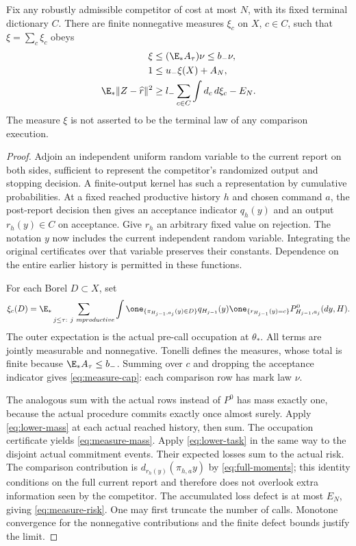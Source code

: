 \begin{lemma}\label{lem:comparison}
Fix any robustly admissible competitor of cost at most $N$, with its fixed terminal dictionary $C$. There are finite nonnegative measures $\xi_c$ on $X$, $c\in C$, such that $\xi=\sum_c\xi_c$ obeys
\begin{align}
 \xi&\le (\E_*A_\tau)\nu\le b_-\nu,\label{eq:measure-cap}\\
 1&\le u_-\xi(X)+A_N,\label{eq:measure-mass}\\
 \E_*\|Z-\widehat r\|^2
 &\ge l_-\sum_{c\in C}\int d_c\,d\xi_c-E_N.
 \label{eq:measure-risk}
\end{align}
The measure $\xi$ is not asserted to be the terminal law of any comparison execution.
\end{lemma}
\begin{proof}
Adjoin an independent uniform random variable to the current report on both sides, sufficient to represent the competitor's randomized output and stopping decision. A finite-output kernel has such a representation by cumulative probabilities. At a fixed reached productive history $h$ and chosen command $a$, the post-report decision then gives an acceptance indicator $q_h(y)$ and an output $r_h(y)\in C$ on acceptance. Give $r_h$ an arbitrary fixed value on rejection. The notation $y$ now includes the current independent random variable. Integrating the original certificates over that variable preserves their constants. Dependence on the entire earlier history is permitted in these functions.

For each Borel $D\subset X$, set
\begin{equation}\label{eq:xi-definition}
 \xi_c(D)=\E_*\sum_{j\le\tau:\ j\ {
m productive}}
 \int\one_{\{\pi_{H_{j-1},a_j}(y)\in D\}}
 q_{H_{j-1}}(y)\one_{\{r_{H_{j-1}}(y)=c\}}
 P^0_{H_{j-1},a_j}(dy,H).
\end{equation}
The outer expectation is the actual pre-call occupation at $\theta_*$. All terms are jointly measurable and nonnegative. Tonelli defines the measures, whose total is finite because $\E_*A_\tau\le b_-$. Summing over $c$ and dropping the acceptance indicator gives \eqref{eq:measure-cap}: each comparison row has mark law $\nu$.

The analogous sum with the actual rows instead of $P^0$ has mass exactly one, because the actual procedure commits exactly once almost surely. Apply \eqref{eq:lower-mass} at each actual reached history, then sum. The occupation certificate yields \eqref{eq:measure-mass}. Apply \eqref{eq:lower-task} in the same way to the disjoint actual commitment events. Their expected losses sum to the actual risk. The comparison contribution is $d_{r_h(y)}(\pi_{h,a}y)$ by \eqref{eq:full-moments}; this identity conditions on the full current report and therefore does not overlook extra information seen by the competitor. The accumulated loss defect is at most $E_N$, giving \eqref{eq:measure-risk}. One may first truncate the number of calls. Monotone convergence for the nonnegative contributions and the finite defect bounds justify the limit.


\end{proof}
